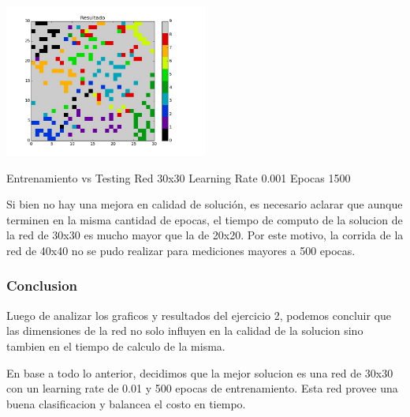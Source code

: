 \includegraphics[width=0.5\textwidth]{img/ej2_test_M_30_lrate_001_epocas_1500}
{\footnotesize Entrenamiento vs Testing Red 30x30 Learning Rate 0.001 Epocas 1500\par}

Si bien no hay una mejora en calidad de soluci\'on, es necesario aclarar que aunque terminen en la misma cantidad de epocas, el tiempo de computo de la solucion de la red de 30x30 es mucho mayor que la de 20x20. Por este motivo, la corrida de la red de 40x40 no se pudo realizar para mediciones mayores a 500 epocas.

\subsubsection{Conclusion}

Luego de analizar los graficos y resultados del ejercicio 2, podemos concluir que las dimensiones de la red no solo influyen en la calidad de la solucion sino tambien en el tiempo de calculo de la misma. 

En base a todo lo anterior, decidimos que la mejor solucion es una red de 30x30 con un learning rate de 0.01 y 500 epocas de entrenamiento. Esta red provee una buena clasificacion y balancea el costo en tiempo.

